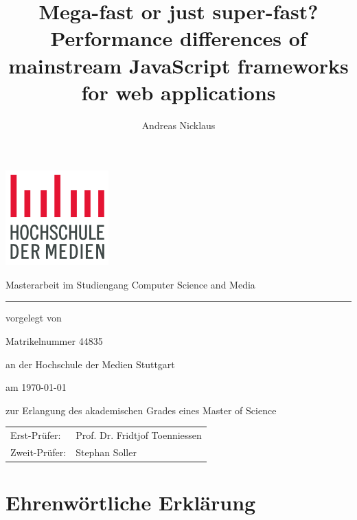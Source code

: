 \documentclass[a4paper, 12pt]{article}
\title{Mega-fast or just super-fast? Performance differences of mainstream JavaScript frameworks for web applications}
\author{Andreas Nicklaus}
\makeatletter
\let\Title\@title
\let\Author\@author
\makeatother
\begin{document}
\begin{titlepage}
	
  \begin{center}

    \includegraphics[width=150px, keepaspectratio]{img/hdm-logo.png}
    
    \vspace{30px}
    {\large Masterarbeit im Studiengang Computer Science and Media}
    
    \vspace{20px}
    {\LARGE \Title}
    
    \vspace{20px}
    \noindent\rule{\textwidth}{1pt}
    
    \vspace{15px}
    vorgelegt von
    
    \vspace{10px}
    \textbf{{\large \Author}}
    
    Matrikelnummer 44835
    
    \vspace{10px}
    an der Hochschule der Medien Stuttgart
    
    \vspace{10px}
    am \today
    
    \vspace{10px}
    zur Erlangung des akademischen Grades eines Master of Science
  \end{center}	
  
  \vfill
  
  {\begin{tabular}[t]{ll}
    Erst-Prüfer: & Prof. Dr. Fridtjof Toenniessen \\
    Zweit-Prüfer: & Stephan Soller
  \end{tabular}}
\end{titlepage}


\section*{Ehrenwörtliche Erklärung}
	
\end{document}

